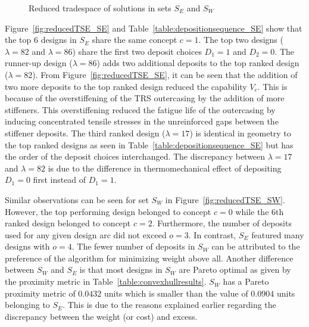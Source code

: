 \begin{figure}[h!]
	\centering
	\caption{Reduced tradespace of solutions in sets $S_E$ and $S_W$}
	\label{fig:reducedTSE}
\end{figure}

Figure~\ref{fig:reducedTSE_SE} and Table~\ref{table:depositionsequence_SE} show that the top 6 designs in $S_E$ share the same concept $c=1$. The top two designs ($\lambda = 82$ and $\lambda = 86$) share the first two deposit choices $D_1=1$ and $D_2=0$. The runner-up design ($\lambda = 86$) adds two additional deposits to the top ranked design ($\lambda = 82$). From Figure~\ref{fig:reducedTSE_SE}, it can be seen that the addition of two more deposits to the top ranked design reduced the capability $V_c$. This is because of the overstiffening of the \ac{TRS} outercasing by the addition of more stiffeners. This overstiffening reduced the fatigue life of the outercasing by inducing concentrated tensile stresses in the unreinforced gaps between the stiffener deposits. The third ranked design ($\lambda = 17$) is identical in geometry to the top ranked designs as seen in Table~\ref{table:depositionsequence_SE} but has the order of the deposit choices interchanged. The discrepancy between $\lambda = 17$ and $\lambda = 82$ is due to the difference in thermomechanical effect of depositing $D_1=0$ first instead of $D_1=1$.

Similar observations can be seen for set $S_W$ in Figure~\ref{fig:reducedTSE_SW}. However, the top performing design belonged to concept $c=0$ while the 6th ranked design belonged to concept $c=2$. Furthermore, the number of deposits used for any given design arc did not exceed $o=3$. In contrast, $S_E$ featured many designs with $o=4$. The fewer number of deposits in $S_W$ can be attributed to the preference of the algorithm for minimizing weight above all. Another difference between $S_W$ and $S_E$ is that most designs in $S_W$ are Pareto optimal as given by the proximity metric in Table~\ref{table:convexhullresults}. $S_W$ has a Pareto proximity metric of $0.0432$ units which is smaller than the value of $0.0904$ units belonging to $S_E$. This is due to the reasons explained earlier regarding the discrepancy between the weight (or cost) and excess. 


